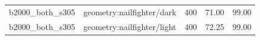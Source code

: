 \begin{longtable}{l>{\raggedright\arraybackslash}p{.42\linewidth}rrr}
b2000\_\allowbreak{}both\_\allowbreak{}s305 & %
geometry:nailfighter/dark & %
400 & %
71.00 & %
99.00 \\ %

b2000\_\allowbreak{}both\_\allowbreak{}s305 & %
geometry:nailfighter/light & %
400 & %
72.25 & %
99.00 \\ %


\end{longtable}

